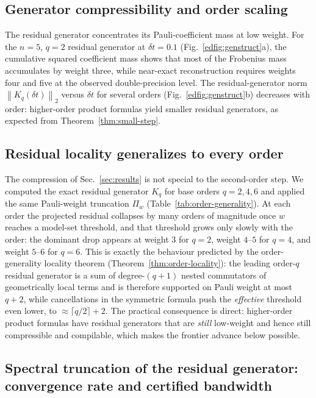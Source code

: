 \documentclass[aps,prxquantum,reprint,superscriptaddress,nofootinbib,amsmath,amssymb]{revtex4-2}
\newcommand{\norm}[1]{\left\lVert #1 \right\rVert}
\newcommand{\dt}{\delta t}
\begin{document}
\subsection{Generator compressibility and order scaling}

The residual generator concentrates its Pauli-coefficient mass at low weight. For the $n=5$, $q=2$ residual generator at $\dt=0.1$ (Fig.~\ref{edfig:genstruct}a), the cumulative squared coefficient mass shows that most of the Frobenius mass accumulates by weight three, while near-exact reconstruction requires weights four and five at the observed double-precision level. The residual-generator norm $\norm{K_q(\dt)}_2$ versus $\dt$ for several orders (Fig.~\ref{edfig:genstruct}b) decreases with order: higher-order product formulas yield smaller residual generators, as expected from Theorem~\ref{thm:small-step}.

\subsection{Residual locality generalizes to every order}
\label{sec:order-generality}

The compression of Sec.~\ref{sec:results} is not special to the second-order step. We computed the exact residual generator $K_q$ for base orders $q=2,4,6$ and applied the same Pauli-weight truncation $\Pi_w$ (Table~\ref{tab:order-generality}). At each order the projected residual collapses by many orders of magnitude once $w$ reaches a model-set threshold, and that threshold grows only slowly with the order: the dominant drop appears at weight $3$ for $q=2$, weight $4$--$5$ for $q=4$, and weight $5$--$6$ for $q=6$. This is exactly the behaviour predicted by the order-generality locality theorem (Theorem~\ref{thm:order-locality}): the leading order-$q$ residual generator is a sum of degree-$(q{+}1)$ nested commutators of geometrically local terms and is therefore supported on Pauli weight at most $q+2$, while cancellations in the symmetric formula push the \emph{effective} threshold even lower, to $\approx\lceil q/2\rceil+2$. The practical consequence is direct: higher-order product formulas have residual generators that are \emph{still} low-weight and hence still compressible and compilable, which makes the frontier advance below possible.



\subsection{Spectral truncation of the residual generator: convergence rate and certified bandwidth}
\label{sec:spectral}
\end{document}
